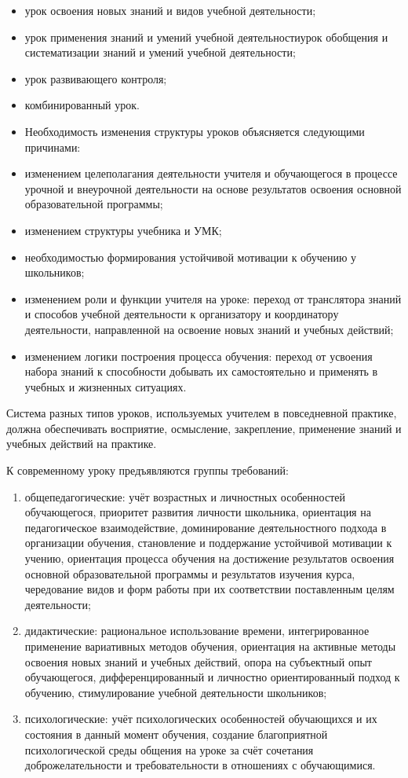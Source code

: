 \documentclass[
  11pt,
  russian,
]{book}
\begin{document}
\begin{itemize}
\item
  урок освоения новых знаний и видов учебной деятельности;
\item
  урок применения знаний и умений учебной деятельностиурок обобщения и систематизации знаний и умений учебной деятельности;
\item
  урок развивающего контроля;
\item
  комбинированный урок.
\item
  Необходимость изменения структуры уроков объясняется следующими причинами:
\item
  изменением целеполагания деятельности учителя и обучающегося в процессе урочной и внеурочной деятельности на основе результатов освоения основной образовательной программы;
\item
  изменением структуры учебника и УМК;
\item
  необходимостью формирования устойчивой мотивации к обучению у школьников;
\item
  изменением роли и функции учителя на уроке: переход от транслятора знаний и способов учебной деятельности к организатору и координатору деятельности, направленной на освоение новых знаний и учебных действий;
\item
  изменением логики построения процесса обучения: переход от усвоения набора знаний к способности добывать их самостоятельно и применять в учебных и жизненных ситуациях.
\end{itemize}

Система разных типов уроков, используемых учителем в повседневной практике, должна обеспечивать восприятие, осмысление, закрепление, применение знаний и учебных действий на практике.

К современному уроку предъявляются группы требований:

\begin{enumerate}
\def\labelenumi{\arabic{enumi})}
\item
  общепедагогические: учёт возрастных и личностных особенностей обучающегося, приоритет развития личности школьника, ориентация на педагогическое взаимодействие, доминирование деятельностного подхода в организации обучения, становление и поддержание устойчивой мотивации к учению, ориентация процесса обучения на достижение результатов освоения основной образовательной программы и результатов изучения курса, чередование видов и форм работы при их соответствии поставленным целям деятельности;
\item
  дидактические: рациональное использование времени, интегрированное применение вариативных методов обучения, ориентация на активные методы освоения новых знаний и учебных действий, опора на субъектный опыт обучающегося, дифференцированный и личностно ориентированный подход к обучению, стимулирование учебной деятельности школьников;
\item
  психологические: учёт психологических особенностей обучающихся и их состояния в данный момент обучения, создание благоприятной психологической среды общения на уроке за счёт сочетания доброжелательности и требовательности в отношениях с обучающимися.
\end{enumerate}
\end{document}
